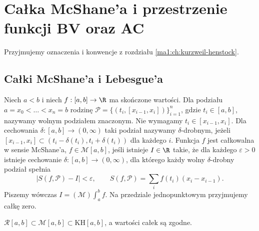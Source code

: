 \chapter{Całka McShane'a i przestrzenie funkcji BV oraz AC}
\providecommand{\atlasref}[2]{#2}
\label{ma1:ch:calka-mcshane-a-i-przestrzenie-bv-ac}
\begingroup
\providecommand{\osc}{\operatorname{osc}}
\providecommand{\Var}{\operatorname{Var}}
\providecommand{\mesh}{\operatorname{mesh}}
\providecommand{\supp}{\operatorname{supp}}
\providecommand{\AC}{\mathrm{AC}}
\providecommand{\BV}{\mathrm{BV}}
\providecommand{\HK}{\mathrm{KH}}
\providecommand{\ind}[1]{\chi_{#1}}
\providecommand{\Dn}{\underline D}
\providecommand{\Du}{\overline D}
\providecommand{\KS}{\mathrm{KS}}
Przyjmujemy oznaczenia i konwencje z rozdziału \ref{ma1:ch:kurzweil-henstock}.
\section{Całki McShane'a i Lebesgue'a}
\begin{definicja}\label{it:def:mcshane}
Niech $a<b$ i niech $f:[a,b]\to\R$ ma skończone wartości. Dla podziału $a=x_0<\dots<x_n=b$ rodzinę
$\mathcal P=\{(t_i,[x_{i-1},x_i])\}_{i=1}^n$,
gdzie $t_i\in[a,b]$, nazywamy wolnym podziałem
znaczonym. Nie wymagamy $t_i\in[x_{i-1},x_i]$.
Dla cechowania $\delta:[a,b]\to(0,\infty)$
taki podział nazywamy $\delta$-drobnym, jeżeli
$[x_{i-1},x_i]\subset(t_i-\delta(t_i),t_i+\delta(t_i))$
dla każdego $i$. Funkcja $f$ jest całkowalna w sensie McShane'a, $f\in\mathcal M[a,b]$, jeśli istnieje $I\in\R$ takie, że dla każdego $\varepsilon>0$ istnieje cechowanie $\delta:[a,b]\to(0,\infty)$, dla którego każdy wolny $\delta$-drobny podział spełnia
\[
\left|S(f,\mathcal P)-I\right|<\varepsilon,\qquad
 S(f,\mathcal P)=\sum_i f(t_i)(x_i-x_{i-1}).
\]
Piszemy wówczas $I=(\mathcal M)\int_a^b f$. Na przedziale jednopunktowym przyjmujemy całkę zero.
\end{definicja}
\begin{stwierdzenie}\label{ma1:kh:prop:riemann-mcshane}
$\mathcal R[a,b]\subset\mathcal M[a,b]\subset\HK[a,b]$, a wartości całek są zgodne.
\end{stwierdzenie}
